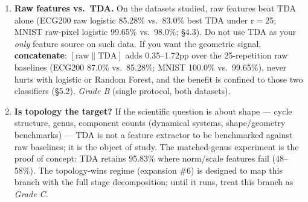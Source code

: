 \begin{enumerate}
  \item \textbf{Raw features vs.\ TDA.} On the datasets studied, raw features
    beat TDA alone (ECG200 raw logistic 85.28\% vs.\ 83.0\% best TDA under
    r$=$25; MNIST raw-pixel logistic 99.65\% vs.\ 98.0\%; \S4.3). Do not use
    TDA as your \emph{only} feature source on such data. If you want the
    geometric signal, \textbf{concatenate}: $[\text{raw} \| \text{TDA}]$
    adds 0.35--1.72pp over the 25-repetition raw baselines (ECG200 87.0\%
    vs.\ 85.28\%; MNIST 100.0\% vs.\ 99.65\%), never hurts with logistic or
    Random Forest, and the benefit is confined to those two classifiers
    (\S5.2). \emph{Grade B} (single protocol, both datasets).

  \item \textbf{Is topology the target?} If the scientific question is about
    shape --- cycle structure, genus, component counts (dynamical systems,
    shape/geometry benchmarks) --- TDA is not a feature extractor to be
    benchmarked against raw baselines; it is the object of study. The
    matched-genus experiment is the proof of concept: TDA retains 95.83\%
    where norm/scale features fail (48--58\%). The topology-wins regime
    (expansion \#6) is designed to map this branch with the full stage
    decomposition; until it runs, treat this branch as \emph{Grade C}.
\end{enumerate}

